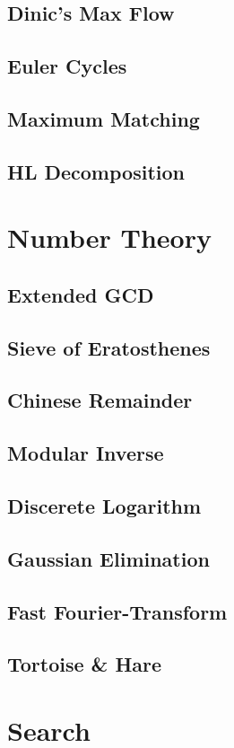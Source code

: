 \documentclass[twocolumn]{article}
\begin{document}
		\subsection{Dinic's Max Flow}
		\subsection{Euler Cycles}
		\subsection{Maximum Matching}
		\subsection{HL Decomposition}
	\section{Number Theory}
		\subsection{Extended GCD}
		\subsection{Sieve of Eratosthenes}
		\subsection{Chinese Remainder}
		\subsection{Modular Inverse}
		\subsection{Discerete Logarithm}
		\subsection{Gaussian Elimination}
		\subsection{Fast Fourier-Transform}
			
		\subsection{Tortoise \& Hare}
			
	\section{Search}
\end{document}
